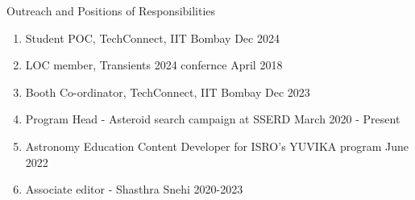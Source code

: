 \begin{rSection}{Outreach and Positions of Responsibilities} 
\begin{enumerate}[itemsep=-0.5em, leftmargin=0.5em]
    \item [] Student POC,  TechConnect, IIT Bombay \hfill Dec 2024
    \item [] LOC member, Transients 2024 confernce \hfill April 2018
    \item [] Booth Co-ordinator, TechConnect, IIT Bombay \hfill Dec 2023
    \item [] Program Head - Asteroid search campaign at SSERD \hfill March 2020 - Present
    \item [] Astronomy Education Content Developer for ISRO’s YUVIKA program \hfill June 2022
    \item [] Associate editor - Shasthra Snehi \hfill 2020-2023
\end{enumerate}
\end{rSection}
